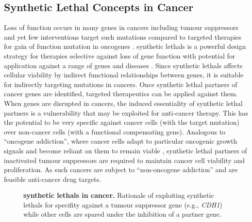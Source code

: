 \subsection{Synthetic Lethal Concepts in Cancer}

Loss of function occurs in many genes in cancers including tumour suppressors and yet few interventions target such mutations compared to targeted therapies for gain of function mutation in oncogenes \citep{Kaelin2005}. \Glspl{synthetic lethal} is a powerful design strategy for therapies selective against loss of gene function with potential for application against a range of genes and diseases \citep{Kaelin2009, Fece2015}. Since \glspl{synthetic lethal} affects cellular viability by indirect functional relationships between genes, it is suitable for indirectly targeting mutations in cancers. Once \gls{synthetic lethal} partners of cancer genes are identified, targeted therapeutics can be applied against them. When genes are disrupted in cancers, the induced essentiality of \gls{synthetic lethal} partners is a vulnerability that may be exploited for anti-cancer therapy. This has the potential to be very specific against cancer cells (with the target mutation) over non-cancer cells (with a functional compensating gene). Analogous to ``oncogene addiction'', where cancer cells adapt to particular oncogenic growth signals and become reliant on them to remain viable \citep{Luo2009, Weinstein2000}, \gls{synthetic lethal} partners of inactivated tumour suppressors are required to maintain cancer cell viability and proliferation. As such cancers are subject to ``non-oncogene addiction'' and are feasible anti-cancer drug targets. 


\begin{figure}[!ht]
      \caption[\Glspl{synthetic lethal} in cancer]{\small \textbf{\Glspl{synthetic lethal} in cancer.} Rationale of exploiting \glspl{synthetic lethal} for specifity against a tumour suppressor gene (e.g.,  \textit{CDH1}) while other cells are spared under the inhibition of a partner gene.}
\label{fig:SL_Concept}
\end{figure}

